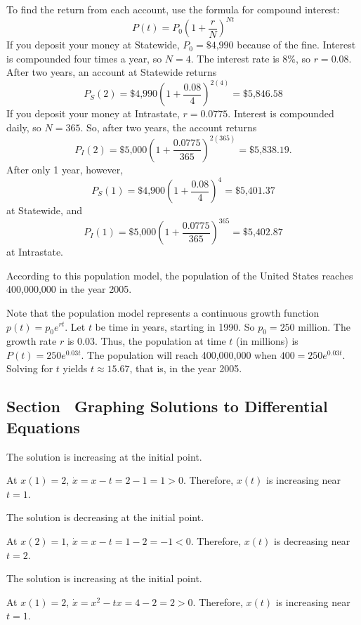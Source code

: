\soln To find the return from each account, use the formula for
compound interest:
\[
P(t) = P_0\left(1 + \frac{r}{N}\right)^{Nt}
\]
If you deposit your money at Statewide, $P_0 = \$4\mbox{,}990$ because of the
fine.  Interest is compounded four times a year, so $N = 4$.  The interest
rate is 8\%, so $r = 0.08$.
After two years, an account at Statewide returns
\[
P_{S}(2) = \$4\mbox{,}990\left(1 + \frac{0.08}{4}\right)^{2(4)} = 
\$5\mbox{,}846.58
\]
If you deposit your money at Intrastate, $r = 0.0775$.  Interest is
compounded daily, so $N = 365$.  So, after two years, the account returns
\[
P_{I}(2) = \$5\mbox{,}000\left(1 + \frac{0.0775}{365}\right)^{2(365)} = 
\$5\mbox{,}838.19.
\]
After only 1 year, however,
\[
P_{S}(1) = \$4\mbox{,}900\left(1 + \frac{0.08}{4}\right)^{4} = \$5\mbox{,}401.37
\]
at Statewide, and
\[
P_{I}(1) = \$5\mbox{,}000\left(1 + \frac{0.0775}{365}\right)^{365} = 
\$5\mbox{,}402.87
\]
at Intrastate.

\ans According to this population model, the population of the United States
reaches 400,000,000 in the year 2005.

\soln Note that the population model represents a continuous growth
function $p(t) = p_0e^{rt}$.  Let $t$ be time in years, starting in 1990. 
So $p_0 = 250$ million.  The growth rate $r$ is $0.03$.  Thus, the
population at time $t$ (in millions) is $P(t) = 250e^{0.03t}$.
The population will reach 400,000,000 when $400 = 250e^{0.03t}$.
Solving for $t$ yields $t \approx 15.67$, that is, in the year 2005.


\subsection*{Section~\protect{\ref{S:3.2}} Graphing Solutions to Differential
Equations}

 \ans The solution is increasing at the initial point.

\soln At $x(1)=2$, $\dot{x}=x-t=2-1=1>0$.  Therefore, $x(t)$ is increasing
near $t=1$.

 \ans The solution is decreasing at the initial point.

\soln At $x(2)=1$, $\dot{x}=x-t=1-2=-1<0$.  Therefore, $x(t)$ is decreasing
near $t=2$.

 \ans The solution is increasing at the initial point.

\soln At $x(1)=2$, $\dot{x}=x^2-tx=4-2=2>0$.  Therefore, $x(t)$ is increasing
near $t=1$.

